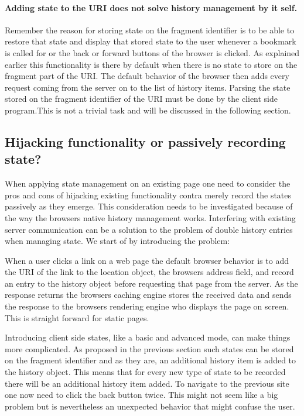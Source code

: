 \documentclass[english]{ifimaster}
\begin{document}
\paragraph{Adding state to the URI does not solve history management by it self.} 
Remember the reason for storing state on the fragment identifier is to be able to restore that state and display that stored state to the user whenever a bookmark is called for or the back or forward buttons of the browser is clicked. As explained earlier this functionality is there by default when there is no state to store on the fragment part of the URI. The default behavior of the browser then adds every request coming from the server on to the list of history items. Parsing the state stored on the fragment identifier of the URI must be done by the client side program.This is not a trivial task and will be discussed in the following section.

\subsection{Hijacking functionality or passively recording state?}
When applying state management on an existing page one need to consider the pros and cons of hijacking existing functionality contra merely record the states passively as they emerge. This consideration needs to be investigated because of the way the browsers native history management works. Interfering with existing server communication can be a solution to the problem of double history entries when managing state. We start of by introducing the problem: 

When a user clicks a link on a web page the default browser behavior is to add the URI of the link to the location object, the browsers address field, and record an entry to the history object before requesting that page from the server. As the response returns the browsers caching engine stores the received data and sends the response to the browsers rendering engine who displays the page on screen. This is straight forward for static pages.

Introducing client side states, like a basic and advanced mode, can make things more complicated. As proposed in the previous section such states can be stored on the fragment identifier and as they are, an additional history item is added to the history object. This means that for every new type of state to be recorded there will be an additional history item added. To navigate to the previous site one now need to click the back button twice. This might not seem like a big problem but is nevertheless an unexpected behavior that might confuse the user. 
\end{document}
